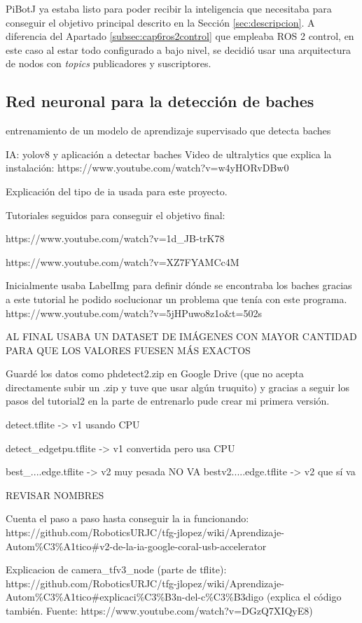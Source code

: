 PiBotJ ya estaba listo para poder recibir la inteligencia que necesitaba para conseguir el objetivo principal descrito en la Sección \ref{sec:descripcion}. A diferencia del Apartado \ref{subsec:cap6ros2control} que empleaba ROS 2 control, en este caso al estar todo configurado a bajo nivel, se decidió usar una arquitectura de nodos con \textit{topics} publicadores y suscriptores.


\subsection{Red neuronal para la detección de baches}
\label{subsec:softwareiayolo}

entrenamiento de un modelo de aprendizaje supervisado que detecta baches


IA: yolov8 y aplicación a detectar baches
Video de ultralytics que explica la instalación: https://www.youtube.com/watch?v=w4yHORvDBw0

Explicación del tipo de ia usada para este proyecto.

Tutoriales seguidos para conseguir el objetivo final: 

https://www.youtube.com/watch?v=1d\_JB-trK78

https://www.youtube.com/watch?v=XZ7FYAMCc4M


Inicialmente usaba LabelImg para definir dónde se encontraba los baches gracias a este tutorial he podido soclucionar un problema que tenía con este programa.  https://www.youtube.com/watch?v=5jHPuwo8z1o\&t=502s

AL FINAL USABA UN DATASET DE IMÁGENES CON MAYOR CANTIDAD PARA QUE LOS VALORES FUESEN MÁS EXACTOS

Guardé los datos como phdetect2.zip en Google Drive (que no acepta directamente subir un .zip y tuve que usar algún truquito) y gracias a seguir los pasos del tutorial2 en la parte de entrenarlo pude crear mi primera versión.


detect.tflite -> v1 usando CPU

detect\_edgetpu.tflite -> v1 convertida pero usa CPU

best\_....edge.tflite -> v2 muy pesada NO VA
bestv2.....edge.tflite -> v2 que sí va 

REVISAR NOMBRES 


Cuenta el paso a paso hasta conseguir la ia funcionando: https://github.com/RoboticsURJC/tfg-jlopez/wiki/Aprendizaje-Autom\%C3\%A1tico\#v2-de-la-ia-google-coral-usb-accelerator 

Explicacion de camera\_tfv3\_node (parte de tflite): https://github.com/RoboticsURJC/tfg-jlopez/wiki/Aprendizaje-Autom\%C3\%A1tico\#explicaci\%C3\%B3n-del-c\%C3\%B3digo (explica el código también. Fuente: https://www.youtube.com/watch?v=DGzQ7XIQyE8)


